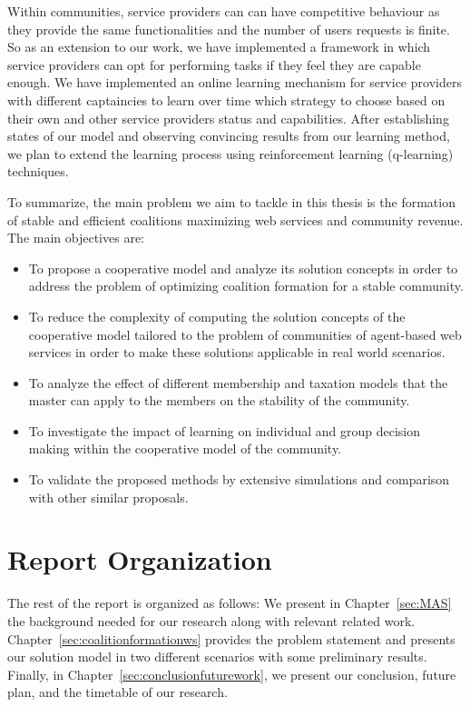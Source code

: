 Within communities, service providers can 
can have competitive behaviour as they provide the same functionalities and the number of users requests is finite. So as an extension to our work, we have implemented a framework in which service providers can opt for performing tasks if they feel they are capable enough.
We have implemented an online learning mechanism for service providers with different captaincies to learn over time which strategy to choose based on their own and other service providers status and capabilities. After establishing states of our model and observing convincing results from our learning method, we plan to extend the learning process using reinforcement learning (q-learning) techniques.


\indent To summarize, the main problem we aim to tackle in this
thesis is the formation of stable and efficient coalitions
maximizing web services and community revenue. The main objectives
are:
\begin{itemize}
\item To propose a cooperative model and analyze its solution
concepts in order to address the problem of optimizing coalition
formation for a stable community.

\item To reduce the complexity of computing the solution concepts
of the cooperative model tailored to the problem of communities of
agent-based web services in order to make these solutions
applicable in real world scenarios.

\item To analyze the effect of different membership and taxation
models that the master can apply to the members on the stability
of the community.

\item To investigate the impact of learning on individual and
group decision making within the cooperative model of the
community.

\item To validate the proposed methods by extensive simulations
and comparison with other similar proposals.
\end{itemize}




\section{Report Organization}\label{sec:outline}
The rest of the report is organized as follows: We present in
Chapter~\ref{sec:MAS} the background needed for our research along
with relevant related work. Chapter~\ref{sec:coalitionformationws}
provides the problem statement and presents our solution model in
two different scenarios with some preliminary results. Finally, in
Chapter~\ref{sec:conclusionfuturework}, we present our conclusion,
future plan, and the timetable of our research.

